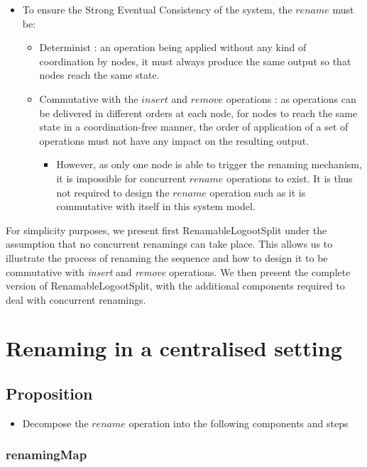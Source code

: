 \documentclass{article}
\theoremstyle{definition}
\theoremstyle{definition}
\theoremstyle{definition}
\theoremstyle{definition}
\begin{document}
\begin{itemize}
    \item To ensure the Strong Eventual Consistency of the system, the $rename$ must be:
    \begin{itemize}
        \item Determinist : an operation being applied without any kind of coordination by nodes, it must always produce the same output so that nodes reach the same state.
        \item Commutative with the $insert$ and $remove$ operations : as operations can be delivered in different orders at each node, for nodes to reach the same state in a coordination-free manner, the order of application of a set of operations must not have any impact on the resulting output.
        \begin{itemize}
            \item However, as only one node is able to trigger the renaming mechanism, it is impossible for concurrent $rename$ operations to exist. It is thus not required to design the $rename$ operation such as it is commutative with itself in this system model.
        \end{itemize}
    \end{itemize}
\end{itemize}

For simplicity purposes, we present first RenamableLogootSplit under the assumption that no concurrent renamings can take place.
This allows us to illustrate the process of renaming the sequence and how to design it to be commutative with \emph{insert} and \emph{remove} operations.
We then present the complete version of RenamableLogootSplit, with the additional components required to deal with concurrent renamings.

\section{Renaming in a centralised setting}

\subsection{Proposition}

\begin{itemize}
    \item Decompose the $rename$ operation into the following components and steps
\end{itemize}

\subsubsection{renamingMap}
\end{document}
